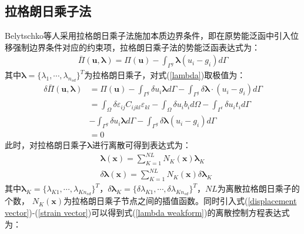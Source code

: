 \subsection{拉格朗日乘子法}
Belytschko等人采用拉格朗日乘子法施加本质边界条件，即在原势能泛函中引入位移强制边界条件对应的约束项，拉格朗日乘子法的势能泛函表达式为：
\begin{equation}\label{lambda}
\begin{split}
    \bar{\Pi}(\pmb{u},\pmb{\lambda})=\Pi(\pmb{u})-\int_{\Gamma^g}\pmb{\lambda}(u_i-g_i)d\Gamma
\end{split}
\end{equation}   
其中$\pmb{\lambda}=\{\lambda_1,\dotsb,\lambda_{n_{sd}}\}^T$为拉格朗日乘子，对式(\ref{lambda})取极值为：
\begin{equation}\label{lambda weakform}
\begin{split}
        \delta\bar{\Pi}(\pmb{u},\pmb{\lambda})&=\Pi(\pmb{u})-\int_{\Gamma^g}\delta u_i\pmb{\lambda}d\Gamma-\int_{\Gamma^g}\delta\pmb{\lambda}\cdot(u_i-g_i)d\Gamma\\
       &=\int_{\Omega}\delta\varepsilon_{ij}C_{ijkl}\varepsilon_{kl}-\int_{\Omega}\delta u_ib_id\Omega-\int_{\Gamma^t}\delta u_it_id\Gamma\\
       &-\int_{\Gamma^g}\delta u_i\pmb{\lambda}d\Gamma-\int_{\Gamma^g}\delta\pmb{\lambda}(u_i-g_i)d\Gamma\\
       &=0
\end{split}
\end{equation} 
此时，对拉格朗日乘子$\pmb{\lambda}$进行离散可得到表达式为：
\begin{equation}
\begin{split}
    &\pmb{\lambda}(\pmb{x})=\sum_{K=1}^{NL}N_K(\pmb{x})\pmb \lambda_K\\
&\delta\pmb{\lambda}(\pmb{x})=\sum_{K=1}^{NL}N_K(\pmb{x})\delta\pmb \lambda_K
\end{split}
\end{equation}
其中$\pmb \lambda_K=\{\lambda_{K1},\dotsb,\lambda_{Kn_{sd}}\}^T$，$\delta\pmb \lambda_K=\{\delta\lambda_{K1},\dotsb,\delta\lambda_{Kn_{sd}}\}^T$，$NL$为离散拉格朗日乘子的个数，
$N_K(\pmb{x})$为拉格朗日乘子节点之间的插值函数。同时引入式(\ref{displacement vector})-(\ref{strain vector})可以得到式(\ref{lambda weakform})的离散控制方程表达式为：
